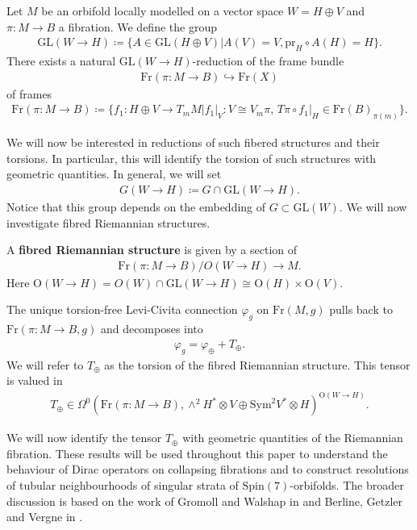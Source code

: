\documentclass[psamsfonts]{amsart}
\theoremstyle{plain}
\theoremstyle{definition}{
\newtheorem{defi}{Definition}[section]
\newtheorem{ass}{Assumption}
\newtheorem*{nota}{Notation}}
\theoremstyle{remark}{
\newtheorem{rem}{Remark}
\newtheorem{ex}{Example}}
\theoremstyle{plain}{
\newtheorem{thm}{Theorem}[section]
\newtheorem{lem}{Lemma}[section]
\newtheorem{cor}{Corollary}[section]
\newtheorem{prop}{Proposition}[section]
\newtheorem{con}{Conjecture}[section]}
\newcommand{\m}[1]{{\mathrm{#1}}}
\begin{document}
Let $M$ be an orbifold locally modelled on a vector space $W=H\oplus V$ and $\pi\colon M\rightarrow B$ a fibration. We define the group 
\begin{align*}
    \m{GL}(W\to H)\coloneqq \{A\in\m{GL}(H\oplus V)|A(V)=V,\m{pr}_H\circ A(H)=H\}.
\end{align*}
There exists a natural $\m{GL}(W\to H)$-reduction of the frame bundle 
\begin{align*}
    \m{Fr}(\pi\colon M\rightarrow B)\hookrightarrow \m{Fr}(X)
\end{align*}
of frames
\begin{align*}
    \m{Fr}(\pi\colon M\rightarrow B)\coloneqq\{f_1\colon H\oplus V \rightarrow T_{m}M|f_1|_{V}\colon V\cong V_m\pi,\, T\pi\circ f_1|_H\in \m{Fr}(B)_{\pi(m)}\}. 
\end{align*}


We will now be interested in reductions of such fibered structures and their torsions. In particular, this will identify the torsion of such structures with geometric quantities. In general, we will set 
\begin{align*}
    G(W\to H)\coloneqq G\cap \m{GL}(W\to H).
\end{align*}
Notice that this group depends on the embedding of $G\subset \m{GL}(W)$. We will now investigate fibred Riemannian structures. 

\begin{defi}
    A \textbf{fibred Riemannian structure} is given by a section of 
    \begin{align*}
        \m{Fr}(\pi\colon M\rightarrow B)/O(W\to H)\rightarrow M.
    \end{align*}
    Here $\m{O}(W\to H)=O(W)\cap \m{GL}(W\to H)\cong \m{O}(H)\times \m{O}(V)$. 
\end{defi}


The unique torsion-free Levi-Civita connection $\varphi_g$ on $\m{Fr}(M,g)$ pulls back to $\m{Fr}(\pi\colon M\to B,g)$ and decomposes into  
    \begin{align*}
        \varphi_g=\varphi_\oplus+T_{\oplus}.
    \end{align*}
We will refer to $T_{\oplus}$ as the torsion of the fibred Riemannian structure. This tensor is valued in
    \begin{align*}
        T_\oplus\in \Omega^0(\m{Fr}(\pi\colon M\rightarrow B),\wedge^2 H^*\otimes V\oplus \m{Sym}^2 V^*\otimes H)^{\m{O}(W\to H)}.
    \end{align*}

We will now identify the tensor $T_{\oplus}$ with geometric quantities of the Riemannian fibration. These results will be used throughout this paper to understand the behaviour of Dirac operators on collapsing fibrations and to construct resolutions of tubular neighbourhoods of singular strata of $\m{Spin}(7)$-orbifolds. The broader discussion is based on the work of Gromoll and Walshap in \cite{gromoll2009metric} and Berline, Getzler and Vergne in \cite{berline1992heat}.\\
\end{document}
